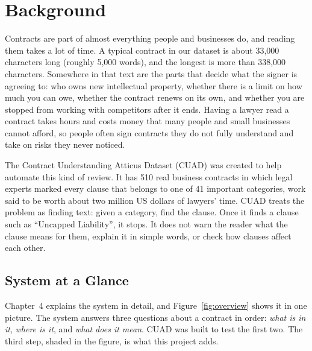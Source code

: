 \section{Background}
Contracts are part of almost everything people and businesses do, and reading them takes a lot of time. A typical contract in our dataset is about 33{,}000 characters long (roughly 5{,}000 words), and the longest is more than 338{,}000 characters. Somewhere in that text are the parts that decide what the signer is agreeing to: who owns new intellectual property, whether there is a limit on how much you can owe, whether the contract renews on its own, and whether you are stopped from working with competitors after it ends. Having a lawyer read a contract takes hours and costs money that many people and small businesses cannot afford, so people often sign contracts they do not fully understand and take on risks they never noticed.

The Contract Understanding Atticus Dataset (CUAD) \cite{hendrycks2021cuad} was created to help automate this kind of review. It has 510 real business contracts in which legal experts marked every clause that belongs to one of 41 important categories, work said to be worth about two million US dollars of lawyers' time. CUAD treats the problem as finding text: given a category, find the clause. Once it finds a clause such as ``Uncapped Liability'', it stops. It does not warn the reader what the clause means for them, explain it in simple words, or check how clauses affect each other.

\subsection{System at a Glance}
Chapter~4 explains the system in detail, and Figure~\ref{fig:overview} shows it in one picture. The system answers three questions about a contract in order: \emph{what is in it}, \emph{where is it}, and \emph{what does it mean}. CUAD was built to test the first two. The third step, shaded in the figure, is what this project adds.


